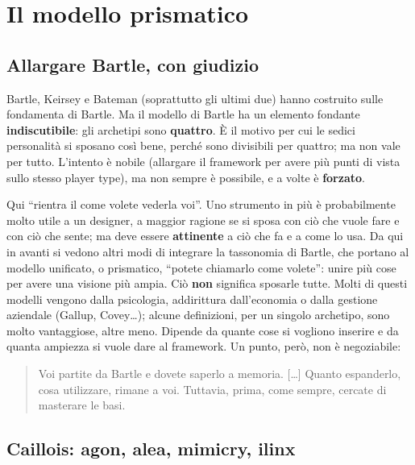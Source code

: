 \section{Il modello prismatico}
\label{gd18:sec:prismatico}

\subsection{Allargare Bartle, con giudizio}

Bartle, Keirsey e Bateman (soprattutto gli ultimi due) hanno costruito sulle
fondamenta di Bartle. Ma il modello di Bartle ha un elemento fondante
\textbf{indiscutibile}: gli archetipi sono \textbf{quattro}. È il motivo per cui le
sedici personalità si sposano così bene, perché sono divisibili per quattro; ma non
vale per tutto. L'intento è nobile (allargare il framework per avere più punti di
vista sullo stesso player type), ma non sempre è possibile, e a volte è
\textbf{forzato}.

Qui ``rientra il come volete vederla voi''. Uno strumento in più è probabilmente
molto utile a un designer, a maggior ragione se si sposa con ciò che vuole fare e
con ciò che sente; ma deve essere \textbf{attinente} a ciò che fa e a come lo usa. Da
qui in avanti si vedono altri modi di integrare la tassonomia di Bartle, che portano
al modello unificato, o prismatico, ``potete chiamarlo come volete'': unire più cose
per avere una visione più ampia. Ciò \textbf{non} significa sposarle tutte. Molti di
questi modelli vengono dalla psicologia, addirittura dall'economia o dalla gestione
aziendale (Gallup, Covey\dots); alcune definizioni, per un singolo archetipo, sono
molto vantaggiose, altre meno. Dipende da quante cose si vogliono inserire e da
quanta ampiezza si vuole dare al framework. Un punto, però, non è negoziabile:
\begin{quote}
Voi partite da Bartle e dovete saperlo a memoria. [\dots] Quanto espanderlo, cosa
utilizzare, rimane a voi. Tuttavia, prima, come sempre, cercate di masterare le
basi.
\end{quote}


\subsection{Caillois: agon, alea, mimicry, ilinx}

